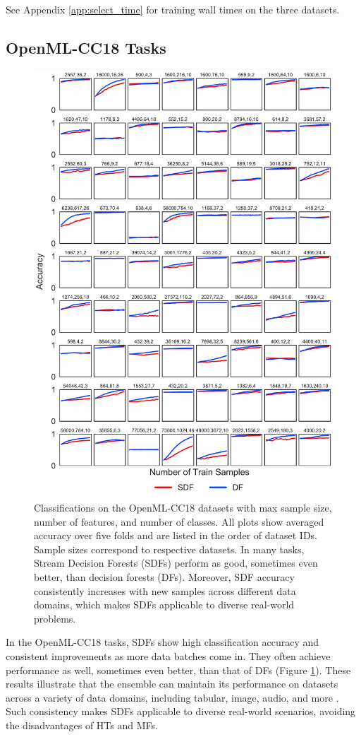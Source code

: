 See Appendix \ref{app:select_time} for training wall times on the three datasets.

\subsection{OpenML-CC18 Tasks}

\begin{figure}[!htpb]
\centering
\includegraphics[width=0.8\columnwidth]{cc18_wide}
  \caption{Classifications on the OpenML-CC18 datasets with max sample size, number of features, and number of classes. All plots show averaged accuracy over five folds and are listed in the order of dataset IDs. Sample sizes correspond to respective datasets. In many tasks, Stream Decision Forests (SDFs) perform as good, sometimes even better, than decision forests (DFs). Moreover, SDF accuracy consistently increases with new samples across different data domains, which makes SDFs applicable to diverse real-world problems.
  }
\label{fig:cc18}
\end{figure}

In the OpenML-CC18 tasks, SDFs show high classification accuracy and consistent improvements as more data batches come in. They often achieve performance as well, sometimes even better, than that of DFs (Figure \ref{fig:cc18}). These results illustrate that the ensemble can maintain its performance on datasets across a variety of data domains, including tabular, image, audio, and more \citep{bischl_openml_2019}. Such consistency makes SDFs applicable to diverse real-world scenarios, avoiding the disadvantages of HTs and MFs.


